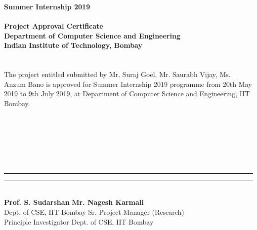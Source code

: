 \documentclass[11pt]{report}
\begin{document}
	\pagebreak
	\begin{center}
		\Huge
		\ \\ \ \\ \ \\
		\textbf{Summer Internship 2019} \\
		\ \\
		\textbf{Project Approval Certificate}    
		\ \\
		\Large
		\textbf{Department of Computer Science and Engineering} \\
		\textbf{Indian Institute of Technology, Bombay} \\
		\ \\ \ \\
		
		The project entitled submitted by Mr. Suraj Goel, Mr. Saurabh Vijay, Ms.
		Anzum Bano is approved for Summer Internship 2019 programme from 20th
		May 2019 to 9th July 2019, at Department of Computer Science and Engineering, IIT
		Bombay.
		\ \\
		\ \\
		\  \\
		\ \\
		\ \\
		\ \\ 
		\ \\
	
		
		
	\end{center}
				\rule{180pt}{1pt}
			\hspace{1.5cm}
			\rule{180pt}{1pt} 
			\\
			\Large
			\textbf{Prof. S. Sudarshan}
			\hspace{3.0cm}
			\Large
		    \textbf{Mr. Nagesh Karmali}
			\\
			Dept. of CSE, IIT Bombay
			\hspace{2.0cm}
			Sr. Project Manager (Research)
			\\
			Principle Investigator
			\hspace{3.2cm}
			Dept. of CSE, IIT Bombay
		
			
			
			
	
	\pagebreak
	
\end{document}
